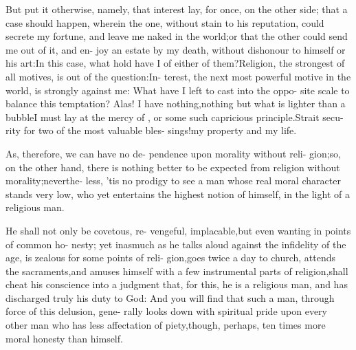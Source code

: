 \documentclass{article}
\begin{document}
\lqq But put it otherwise, namely, that\break
\lqq interest lay, for once, on the other side;\break
\lqq that a case should happen, wherein the\break
\lqq one, without stain to his reputation,\break
\lqq could secrete my fortune, and leave
\lqq me naked in the world;\tsk or that the\break
\lqq other could send me out of it, and en-\break
\lqq joy an estate by my death, without\break
\lqq dishonour to himself or his art:\tsk In\break
\lqq this case, what hold have I of either of\break
\lqq them?\tsk Religion, the strongest of all\break
\lqq motives, is out of the question:\tsk In-\break
\lqq terest, the next most powerful motive\break
\lqq in the world, is strongly against me:\tsk\break
\lqq What have I left to cast into the oppo-\break
\lqq site scale to balance this temptation?\tsk\break
\lqq Alas! I have nothing,\tsk nothing but\break
\lqq what is lighter than a bubble\tsk I must\break
\lqq lay at the mercy of , or some\break
\lqq such capricious principle.\tsk Strait secu-\break
\lqq rity for two of the most valuable bles-\break
\lqq sings!\tsk my property and my life.

\lqq As, therefore, we can have no de-\break
\lqq pendence upon morality without reli-\break
\lqq gion;\tsk so, on the other hand, there is
\lqq nothing better to be expected from\break
\lqq religion without morality;\tsk neverthe-\break
\lqq less, ’tis no prodigy to see a man whose\break
\lqq real moral character stands very low,\break
\lqq who yet entertains the highest notion\break
\lqq of himself, in the light of a religious\break
\lqq man.

\lqq He shall not only be covetous, re-\break
\lqq vengeful, implacable,\tsk but even\break
\lqq wanting in points of common ho-\break
\lqq nesty; yet inasmuch as he talks aloud\break
\lqq against the infidelity of the age,\tsh\break
\lqq is zealous for some points of reli-\break
\lqq gion,\tsh goes twice a day to church,\break
\lqq \tsh attends the sacraments,\tsh and\break
\lqq amuses himself with a few instrumental\break
\lqq parts of religion,\tsk shall cheat his\break
\lqq conscience into a judgment that, for\break
\lqq this, he is a religious man, and has\break
\lqq discharged truly his duty to God:
\lqq And you will find that such a man,\break
\lqq through force of this delusion, gene-\break
\lqq rally looks down with spiritual pride\break
\lqq upon every other man who has less\break
\lqq affectation of piety,\tsk though, perhaps,\break
\lqq ten times more moral honesty than\break
\lqq himself.
\end{document}
